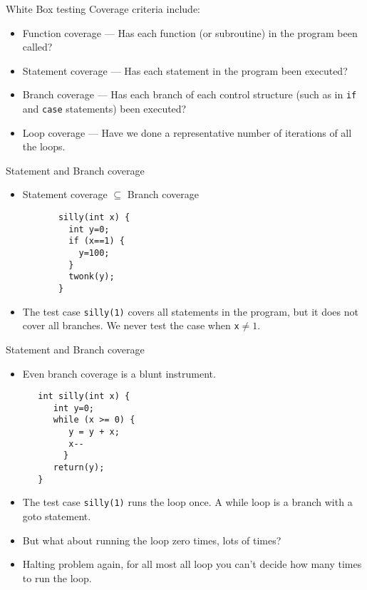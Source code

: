 \documentclass[handout]{beamer}
\begin{document}
\begin{frame}{White Box testing}
Coverage criteria include:
  \begin{itemize}
  \item Function coverage --- Has each function (or subroutine) in the
    program been called?
  \item Statement coverage --- Has each statement in the program been
    executed?  
  \item Branch coverage --- Has each branch of each control structure
    (such as in {\tt if} and {\tt case} statements) been executed?
  \item Loop coverage --- Have we done a representative number of iterations
    of all the loops. 
  \end{itemize}
\end{frame}

\begin{frame}[fragile]{Statement and Branch coverage}

\begin{itemize}
\item Statement coverage $\subseteq$ Branch coverage
\begin{lstlisting}
       silly(int x) {
         int y=0;
         if (x==1) {
           y=100;
         }
         twonk(y);
       }
\end{lstlisting}

  \item  The test case {\tt silly(1)} covers all statements in the program, but
  it does not cover all branches. We never test the case when {\tt x}$\neq1$.
\end{itemize}
\end{frame}

\begin{frame}[fragile]{Statement and Branch coverage}
\begin{itemize}
 \item Even branch coverage is a blunt instrument.
\begin{lstlisting}
   int silly(int x) { 
      int y=0;
      while (x >= 0) {
         y = y + x;
         x--
        }
      return(y);
   }
\end{lstlisting}
  \item The test case {\tt silly(1)} runs the loop once. A while loop is a
    branch with a goto statement. 
  \item But what about running the loop zero times, lots of times?
   \item Halting problem again, for all most all loop you can't
     decide how many times to run the loop.
\end{itemize}
    
\end{frame}
\end{document}
